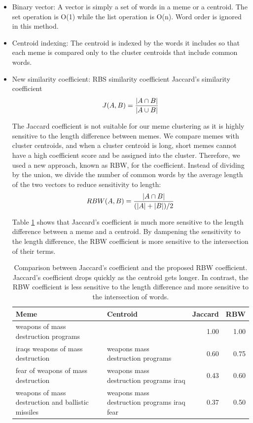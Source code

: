 \documentclass{sig-alternate}
\begin{document}
\begin{itemize}
 \item Binary vector: A vector is simply a set of words in a meme or a centroid. The set operation is O(1) while the list operation is O(n). Word order is ignored in this method.
 \item Centroid indexing: The centroid is indexed by the words it includes so that each meme is compared only to the cluster centroids that include common words.
 \item New similarity coefficient: RBS similarity coefficient
 Jaccard's similarity coefficient 
\begin{displaymath} 
 J(A,B) = {{|A \cap B|}\over{|A \cup B|}}
\end{displaymath} 

The Jaccard coefficient is not suitable for our meme clustering as it is highly sensitive to the length difference between memes. We compare memes with cluster centroids, and when a cluster centroid is long, short memes cannot have a high coefficient score and be assigned into the cluster. Therefore, we used a new approach, known as RBW, for the coefficient. Instead of dividing by the union, we divide the number of common words by the average length of the two vectors to reduce sensitivity to length:\\

\begin{displaymath}
RBW(A, B) = {{|A \cap B|} \over {(|A|+|B|) / 2} }
\end{displaymath}

Table \ref{table:sim} shows that Jaccard's coefficient is much more sensitive to the length difference between a meme and a centroid. By dampening the sensitivity to the length difference, the RBW coefficient is more sensitive to the intersection of their terms. 

\begin{table}[h!t!]
\begin{center}
\begin{tabular}{p{3.0cm}|p{2.2cm}|r|r}
\hline
\textbf{Meme}&\textbf{Centroid}&\textbf{Jaccard}&\textbf{RBW}\\
\hline
weapons of mass destruction programs&&1.00&1.00\\
\hline
iraqs weapons of mass destruction & weapons mass destruction programs&0.60&0.75\\
\hline
fear of weapons of mass destruction & weapons mass destruction programs iraq&0.43&0.60\\
\hline
weapons of mass destruction and ballistic missiles&weapons mass destruction programs iraq fear&0.37&0.50\\
\hline
\end{tabular}
\caption{Comparison between Jaccard's coefficient and the proposed RBW coefficient. Jaccard's coefficient drops quickly as the centroid gets longer. In contrast, the RBW coefficient is less sensitive to the length difference and more sensitive to the intersection of words.}
\label{table:sim}
\end{center}
\end{table}


\end{itemize}
\end{document}
